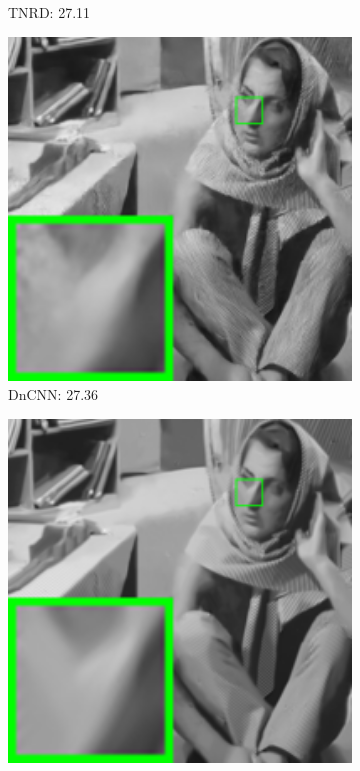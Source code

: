 \begin{figure}
\begin{adjustwidth}{-2cm}{}
\begin{subfigure}[t]{0.19\textwidth}
		\caption{TNRD: 27.11}
    \end{subfigure}
    \hfill
    \begin{subfigure}[t]{0.19\textwidth}
        \centering
        \includegraphics[width=1\textwidth]{images/twsc/awgn/resize_br_DnCNN_40_barbara.png}
		\caption{DnCNN: 27.36}
    \end{subfigure}
    \hfill
    \begin{subfigure}[t]{0.19\textwidth}
        \centering
        \includegraphics[width=1\textwidth]{images/twsc/awgn/resize_br_WSC_40_barbara.png}

\end{subfigure}
\end{adjustwidth}
\end{figure}

